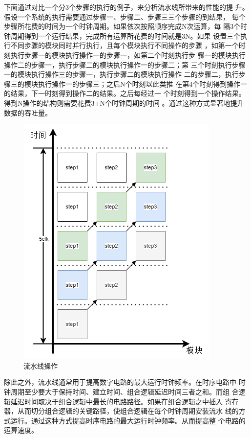 \documentclass{article}
\numberwithin {equation}{section}
\begin{document}
\begin{spacing}{1.25}
      下面通过对比一个分3个步骤的执行的例子，来分析流水线所带来的性能的提
      升。假设一个系统的执行需要通过步骤一、步骤二、步骤三三个步骤的到结果，
      每个步骤所花费的时间为一个时钟周期。如果依次按照顺序完成N次运算，每
      隔3个时钟周期得到一个运行结果，完成所有运算所花费的时间就是3N。如果
      设置三个执行不同步骤的模块同时并行执行，且每个模块执行不同操作的步骤
      ，如第一个时刻执行步骤一的模块执行操作一的步骤一，如第二个时刻执行步
      骤一的模块执行操作二的步骤一，执行步骤二的模块执行操作一的步骤二；第
      三个时刻执行步骤一的模块执行操作三的步骤一，执行步骤二的模块执行操作
      二的步骤二，执行步骤三的模块执行操作一的步骤三；之后N个时刻以此类推
      在第4个时刻得到操作一的结果，下一时刻得到操作二的结果。之后每经过一
      个时刻得到一个操作结果。得到N操作的结构则需要花费3+N个时钟周期的时间
      。通过这种方式显著地提升数据的吞吐量。
      \begin{figure}[H]
        \centering
        \includegraphics[scale=0.6]{./pictures/流水线.png}
        \caption{流水线操作}
      \end{figure}

      除此之外，流水线通常用于提高数字电路的最大运行时钟频率。在时序电路中
      时钟周期至少要大于保持时间、建立时间、组合逻辑延迟时间三者之和。而组
      合逻辑延迟时间取决于组合逻辑中最长的电路路径。如果在组合逻辑之中插入
      寄存器，从而切分组合逻辑的关键路径，使组合逻辑在每个时钟周期安装流水
      线的方式运行。通过这种方式提高时序电路的最大运行时钟频率。从而提高整
      个电路的运算速度。

\end{spacing}
\end{document}
